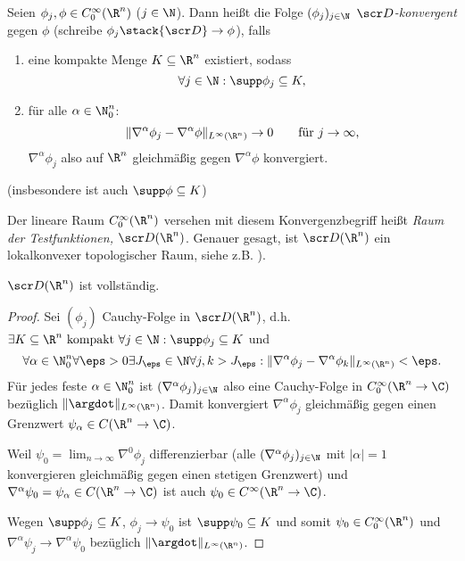 \begin{df} \label{5.2}
	Seien $\phi_j, \phi \in C_0^\infty(\R^n)$ ($j \in \N$).
	Dann heißt die Folge $(\phi_j)_{j\in \N}$ \emph{$\scr D$-konvergent} gegen $\phi$ (schreibe $\phi_j \stack {\scr D}\to \phi$), falls
	\begin{enumerate}[1)]
		\item
			eine kompakte Menge $K \subset \R^n$ existiert, sodass
			\[
				\forall j \in \N: \supp \phi_j \subset K,
			\]
		\item
			für alle $\alpha \in \N_0^n$:
			\[
				\|\nabla^\alpha \phi_j - \nabla^\alpha \phi\|_{L^\infty(\R^n)} \to 0
				\qquad \text{für $j \to \infty$,}
			\]
			$\nabla^\alpha \phi_j$ also auf $\R^n$ gleichmäßig gegen $\nabla^\alpha \phi$ konvergiert.
	\end{enumerate}
	(insbesondere ist auch $\supp \phi \subset K$)

	Der lineare Raum $C_0^\infty(\R^n)$ versehen mit diesem Konvergenzbegriff heißt \emph{Raum der Testfunktionen, $\scr D(\R^n)$}.
	Genauer gesagt, ist $\scr D(\R^n)$ ein lokalkonvexer topologischer Raum, siehe z.B. \cite{reedsimon80}).
\end{df}

\begin{st} \label{5.3}
	$\scr D(\R^n)$ ist vollständig.
	\begin{proof}
		Sei $(\phi_j)$ Cauchy-Folge in $\scr D(\R^n)$, d.h. $\exists K \subset \R^n \text{ kompakt } \forall j \in \N: \supp \phi_j \subset K$ und
		\[
			\forall \alpha \in \N_0^n \forall \eps > 0 \exists J_\eps \in \N \forall j,k > J_\eps : \|\nabla^\alpha \phi_j - \nabla^\alpha \phi_k \|_{L^\infty(\R^n)} < \eps.
		\]
		Für jedes feste $\alpha \in \N_0^n$ ist $(\nabla^\alpha \phi_j)_{j\in \N}$ also eine Cauchy-Folge in $C_0^\infty(\R^n \to \C)$ bezüglich $\|\argdot\|_{L^\infty(\R^n)}$.
		Damit konvergiert $\nabla^\alpha \phi_j$ gleichmäßig gegen einen Grenzwert $\psi_\alpha \in C(\R^n \to \C)$.

		Weil $\psi_0 = \lim_{n\to \infty} \nabla^0 \phi_j$ differenzierbar (alle $(\nabla^\alpha \phi_j)_{j\in\N}$ mit $|\alpha|=1$ konvergieren gleichmäßig gegen einen stetigen Grenzwert) und $\nabla^\alpha \psi_0 = \psi_\alpha \in C(\R^n \to \C)$ ist auch $\psi_0 \in C^\infty (\R^n \to \C)$.

		Wegen $\supp \phi_j \subset K$, $\phi_j \to \psi_0$ ist $\supp \psi_0 \subset K$ und somit $\psi_0 \in C_0^\infty(\R^n)$ und $\nabla^\alpha \psi_j \to \nabla^\alpha \psi_0$ bezüglich $\|\argdot\|_{L^\infty(\R^n)}$.
	\end{proof}
\end{st}

